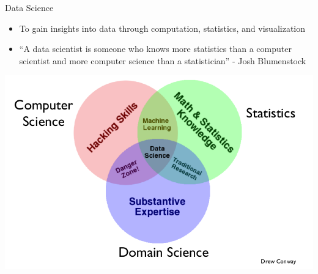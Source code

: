 \documentclass{beamer}
\begin{document}
\begin{frame}{Data Science}
    \begin{itemize}
       \item To gain insights into data through computation, statistics, and visualization
       \item ``A data scientist is someone who knows more statistics than a computer scientist and more computer science than a statistician'' - Josh Blumenstock
    \end{itemize}
\end{frame}
\begin{frame}{}
    \begin{center}
        \includegraphics[scale=0.4]{dataScienceVennDiagram.png}
    \end{center}
\end{frame}
\end{document}
